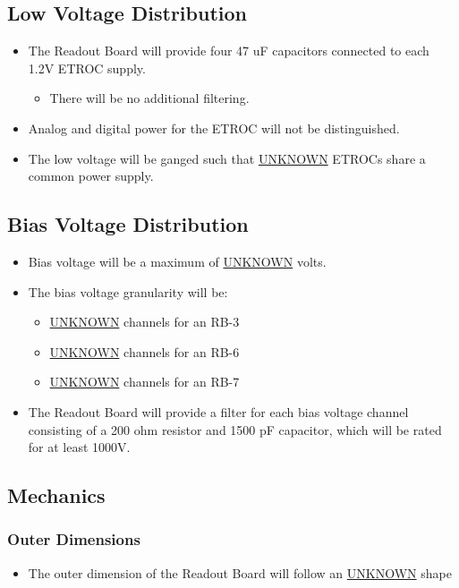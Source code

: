 \documentclass[11pt]{article}
\begin{document}
\subsection{Low Voltage Distribution}
\label{sec:orge3c4306}
\begin{itemize}
\item The Readout Board will provide four 47 uF capacitors connected to each 1.2V ETROC supply.
\begin{itemize}
\item There will be no additional filtering.
\end{itemize}
\item Analog and digital power for the ETROC will not be distinguished.
\item The low voltage will be ganged such that \uline{UNKNOWN} ETROCs share a common power supply.
\end{itemize}
\subsection{Bias Voltage Distribution}
\label{sec:org510ceb3}
\begin{itemize}
\item Bias voltage will be a maximum of \uline{UNKNOWN} volts.
\item The bias voltage granularity will be:
\begin{itemize}
\item \uline{UNKNOWN} channels for an RB-3
\item \uline{UNKNOWN} channels for an RB-6
\item \uline{UNKNOWN} channels for an RB-7
\end{itemize}
\item The Readout Board will provide a filter for each bias voltage channel consisting of a 200 ohm resistor and 1500 pF capacitor, which will be rated for at least 1000V.
\end{itemize}
\subsection{Mechanics}
\label{sec:orgca80916}
\subsubsection{Outer Dimensions}
\label{sec:org635d727}
\begin{itemize}
\item The outer dimension of the Readout Board will follow an \uline{UNKNOWN} shape
\end{itemize}
\end{document}

